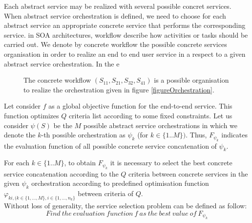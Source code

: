 \documentclass[10pt,journal,compsoc]{IEEEtran}
\begin{document}
Each abstract service may be realized with several possible concret services. When abstract service orchestration is defined, we need to choose for each abstract service an appropriate concrete service that performs the corresponding service.  in SOA architectures, workflow  describe how activities or tasks should be carried out. We denote by concrete workflow the possible  concrete services organisation in order to realize an end to end user service in a respect to a given abstract service orchestration.  In the e
\begin{figure}[htpb]
\centering {}
\caption{ The concrete workflow $(S_{11},S_{21},S_{32},S_{41})$ is a possible organisation to realize the orchestration given in figure \ref{figureOrchestration}. }
\end{figure}


Let consider $f$ as a global objective function for the end-to-end service. This function optimizes $Q$ criteria list according to some fixed constraints. Let us consider $\psi(S)$ be the $M$ possible abstract service orchestrations in which we denote the $k$-th possible orchestration as $\psi_k$ (for $k\in\{1..M\})$. Thus, $F_{\psi_k}$ indicates the evaluation function of all possible concrete service concatenation of $\psi_k$.%


For each $k\in\{1..M\}$,  to obtain $F_{\psi_k}$ it is necessary to select the best concrete service concatenation according to the $Q$ criteria between concrete services in the given $\psi_k$ orchestration according to predefined optimisation function $\varphi_{ki,(k \in\{1, \dots,M\}, i \in\{1,\dots,n_k\}}$ between criteria of $Q$. \\ %
Without loss of generality, %
the service selection problem can be defined as follow: $$ Find ~the ~evaluation~ function~ f~ as~ the~ best ~value ~of ~ F_{\psi_k} $$
\end{document}
